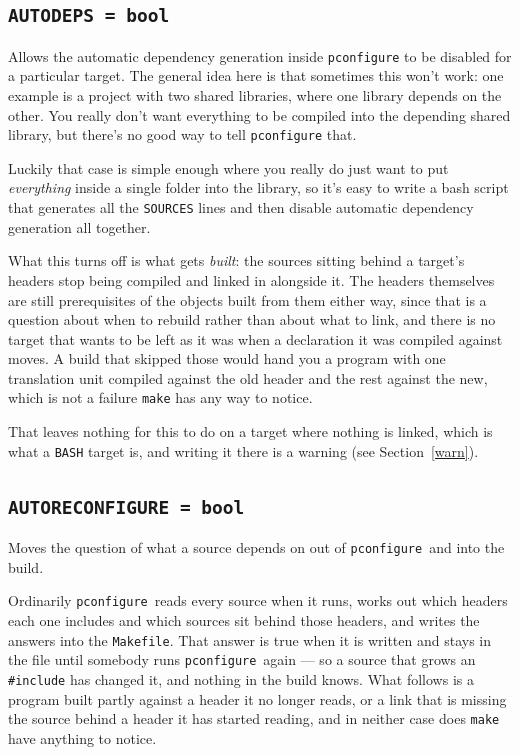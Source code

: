 \documentclass{article}
\newcommand{\pconfigure}{\texttt{pconfigure}}
\begin{document}
\subsection{\texttt{AUTODEPS = bool} \label{cmd:autodeps}}

Allows the automatic dependency generation inside \texttt{pconfigure}
to be disabled for a particular target.  The general idea here is that
sometimes this won't work: one example is a project with two shared
libraries, where one library depends on the other.  You really don't
want everything to be compiled into the depending shared library, but
there's no good way to tell \texttt{pconfigure} that.

Luckily that case is simple enough where you really do just want to
put \textit{everything} inside a single folder into the library, so
it's easy to write a bash script that generates all the
\texttt{SOURCES} lines and then disable automatic dependency
generation all together.

What this turns off is what gets \textit{built}: the sources sitting
behind a target's headers stop being compiled and linked in alongside
it.  The headers themselves are still prerequisites of the objects
built from them either way, since that is a question about when to
rebuild rather than about what to link, and there is no target that
wants to be left as it was when a declaration it was compiled against
moves.  A build that skipped those would hand you a program with one
translation unit compiled against the old header and the rest against
the new, which is not a failure \texttt{make} has any way to notice.

That leaves nothing for this to do on a target where nothing is
linked, which is what a \texttt{BASH} target is, and writing it there
is a warning (see Section~\ref{warn}).

\subsection{\texttt{AUTORECONFIGURE = bool} \label{cmd:autoreconfigure}}

Moves the question of what a source depends on out of \pconfigure\ and
into the build.

Ordinarily \pconfigure\ reads every source when it runs, works out
which headers each one includes and which sources sit behind those
headers, and writes the answers into the \texttt{Makefile}.  That
answer is true when it is written and stays in the file until somebody
runs \pconfigure\ again --- so a source that grows an \texttt{\#include}
has changed it, and nothing in the build knows.  What follows is a
program built partly against a header it no longer reads, or a link
that is missing the source behind a header it has started reading, and
in neither case does \texttt{make} have anything to notice.
\end{document}
